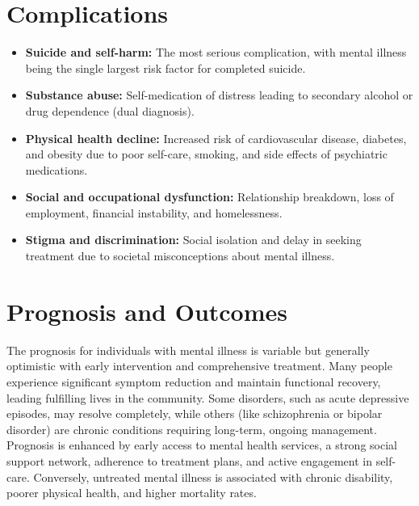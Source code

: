 \section*{Complications}
\begin{itemize}
    \item \textbf{Suicide and self-harm:} The most serious complication, with mental illness being the single largest risk factor for completed suicide.
    \item \textbf{Substance abuse:} Self-medication of distress leading to secondary alcohol or drug dependence (dual diagnosis).
    \item \textbf{Physical health decline:} Increased risk of cardiovascular disease, diabetes, and obesity due to poor self-care, smoking, and side effects of psychiatric medications.
    \item \textbf{Social and occupational dysfunction:} Relationship breakdown, loss of employment, financial instability, and homelessness.
    \item \textbf{Stigma and discrimination:} Social isolation and delay in seeking treatment due to societal misconceptions about mental illness.
\end{itemize}

\section*{Prognosis and Outcomes}
The prognosis for individuals with mental illness is variable but generally optimistic with early intervention and comprehensive treatment. Many people experience significant symptom reduction and maintain functional recovery, leading fulfilling lives in the community. Some disorders, such as acute depressive episodes, may resolve completely, while others (like schizophrenia or bipolar disorder) are chronic conditions requiring long-term, ongoing management. Prognosis is enhanced by early access to mental health services, a strong social support network, adherence to treatment plans, and active engagement in self-care. Conversely, untreated mental illness is associated with chronic disability, poorer physical health, and higher mortality rates.

